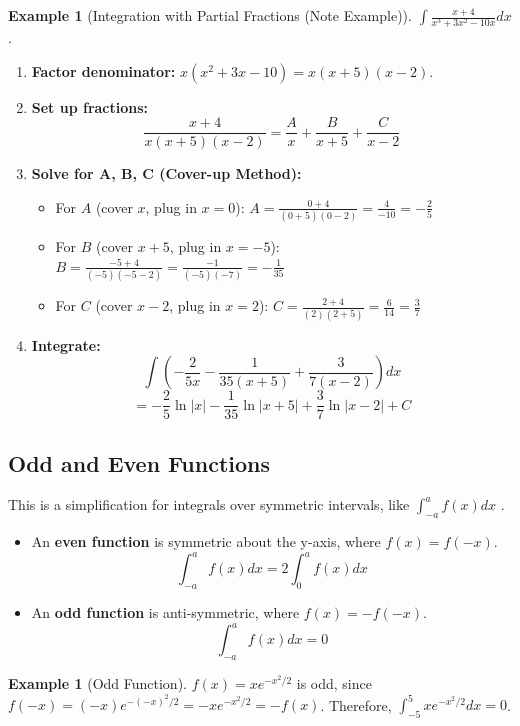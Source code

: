 \documentclass[11pt, a4paper]{article}
\theoremstyle{definition}
\newtheorem{example}[theorem]{Example}
\begin{document}
\begin{example}[Integration with Partial Fractions (Note Example)]
$\int \frac{x+4}{x^3+3x^2-10x} dx$.
\begin{enumerate}
    \item \textbf{Factor denominator:} $x(x^2+3x-10) = x(x+5)(x-2)$.
    \item \textbf{Set up fractions:}
    \[
    \frac{x+4}{x(x+5)(x-2)} = \frac{A}{x} + \frac{B}{x+5} + \frac{C}{x-2}
    \]
    \item \textbf{Solve for A, B, C (Cover-up Method):}
    \begin{itemize}
        \item For $A$ (cover $x$, plug in $x=0$): $A = \frac{0+4}{(0+5)(0-2)} = \frac{4}{-10} = -\frac{2}{5}$
        \item For $B$ (cover $x+5$, plug in $x=-5$): $B = \frac{-5+4}{(-5)(-5-2)} = \frac{-1}{(-5)(-7)} = -\frac{1}{35}$
        \item For $C$ (cover $x-2$, plug in $x=2$): $C = \frac{2+4}{(2)(2+5)} = \frac{6}{14} = \frac{3}{7}$
    \end{itemize}
    \item \textbf{Integrate:}
    \[
    \int \left( -\frac{2}{5x} - \frac{1}{35(x+5)} + \frac{3}{7(x-2)} \right) dx
    \]
    \[
    = -\frac{2}{5}\ln|x| - \frac{1}{35}\ln|x+5| + \frac{3}{7}\ln|x-2| + C
    \]
\end{enumerate}
\end{example}

\subsection{Odd and Even Functions}
This is a simplification for integrals over symmetric intervals, like $\int_{-a}^{a} f(x) dx$ \cite[Sec 1.3.1]{Chan2021}.
\begin{itemize}
    \item An \textbf{even function} is symmetric about the y-axis, where $f(x) = f(-x)$.
    \[
    \int_{-a}^{a} f(x) dx = 2 \int_{0}^{a} f(x) dx
    \]
    \item An \textbf{odd function} is anti-symmetric, where $f(x) = -f(-x)$.
    \[
    \int_{-a}^{a} f(x) dx = 0
    \]
\end{itemize}
\begin{example}[Odd Function]
$f(x) = x e^{-x^2/2}$ is odd, since $f(-x) = (-x)e^{-(-x)^2/2} = -xe^{-x^2/2} = -f(x)$.
Therefore, $\int_{-5}^{5} x e^{-x^2/2} dx = 0$.
\end{example}
\end{document}
